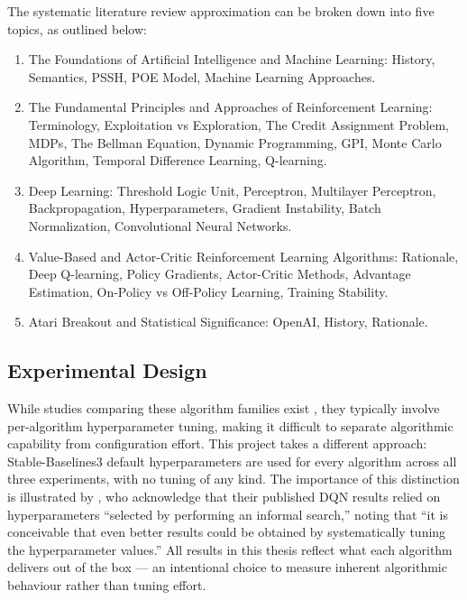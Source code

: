 The systematic literature review approximation can be broken down into five topics, as outlined below:
\begin{enumerate}

    \item The Foundations of Artificial Intelligence and Machine Learning: History, Semantics, PSSH, POE Model, Machine Learning Approaches.

    \item The Fundamental Principles and Approaches of Reinforcement Learning: Terminology, Exploitation vs Exploration, The Credit Assignment Problem, MDPs, The Bellman Equation, Dynamic Programming, GPI, Monte Carlo Algorithm, Temporal Difference Learning, Q-learning.

    \item Deep Learning: Threshold Logic Unit, Perceptron, Multilayer Perceptron, Backpropagation, Hyperparameters, Gradient Instability, Batch Normalization, Convolutional Neural Networks.

    \item Value-Based and Actor-Critic Reinforcement Learning Algorithms: Rationale, Deep Q-learning, Policy Gradients, Actor-Critic Methods, Advantage Estimation, On-Policy vs Off-Policy Learning, Training Stability.

    \item Atari Breakout and Statistical Significance: OpenAI, History, Rationale.

\end{enumerate}



\subsection{Experimental Design}
\label{subsec:experimental-design}

{\color{red} While studies comparing these algorithm families exist \citep{defuente2024comparative}, they typically involve per-algorithm hyperparameter tuning, making it difficult to separate algorithmic capability from configuration effort. This project takes a different approach: Stable-Baselines3 default hyperparameters are used for every algorithm across all three experiments, with no tuning of any kind. The importance of this distinction is illustrated by \citet{mnih2015human}, who acknowledge that their published DQN results relied on hyperparameters ``selected by performing an informal search,'' noting that ``it is conceivable that even better results could be obtained by systematically tuning the hyperparameter values.'' All results in this thesis reflect what each algorithm delivers out of the box --- an intentional choice to measure inherent algorithmic behaviour rather than tuning effort.}




